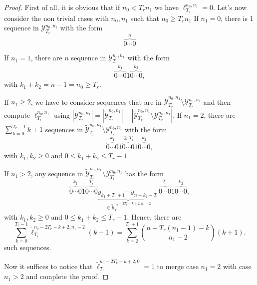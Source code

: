 \documentclass{article}
\begin{document}
  \begin{proof}
    First of all, it is obvious that if $n_0 < T_r n_1$ we have $\ell_{T_r}^{n_0,n_1} = 0$. Let's now consider the non trivial cases with $n_0, n_1$ such that $n_0 \geq T_r n_1$
    If $n_1 = 0$, there is 1 sequence in $\mathcal{Y}_{T_r}^{n_0, n_1}$ with the form 
    \begin{equation*}
      \overbrace{0 \cdots 0}^n
    \end{equation*} 

    If $n_1 = 1$, there are $n$ sequence in $\mathcal{Y}_{T_r}^{n_0, n_1}$ with the form 
    \begin{equation*}
      \overbrace{0 \cdots 0}^{k_1} 1 \overbrace{0 \cdots 0}^{k_2},
    \end{equation*}
    with $k_1 + k_2 = n - 1 = n_0 \geq T_r$.
      
    If $n_1 \geq 2$, we have to consider sequences that are in $\tilde{\mathcal{Y}}_{T_r}^{n_0, n_1} \setminus \mathcal{Y}_{T_r}^{n_0, n_1}$ and then
    compute $\ell_{T_r}^{n_0,n_1}$ using 
    $\left|\mathcal{Y}_{T_r}^{n_0, n_1}\right| = \left|\tilde{\mathcal{Y}}_{T_r}^{n_0, n_1}\right| - \left|\tilde{\mathcal{Y}}_{T_r}^{n_0, n_1} \setminus \mathcal{Y}_{T_r}^{n_0, n_1}\right|$.
    If $n_1 = 2$, there are $\sum_{k=0}^{T_r-1} k+1$ sequences in $\tilde{\mathcal{Y}}_{T_r}^{n_0, n_1}\setminus\mathcal{Y}_{T_r}^{n_0, n_1}$ 
    with the form 
    \begin{equation*}
      \overbrace{0\cdots0}^{k_1} 1 \overbrace{0\cdots0}^{\geq T_r} 1 \overbrace{0\cdots0}^{k_2},
    \end{equation*}
    with $k_1, k_2 \geq 0$ and $0 \leq k_1 + k_2 \leq T_r - 1$.

    If $n_1 > 2$, any sequence in $\tilde{\mathcal{Y}}_{T_r}^{n_0, n_1}\setminus\mathcal{Y}_{T_r}^{n_0, n_1}$ has the form 
    \begin{equation}
      \overbrace{0\cdots0}^{k_1} 1 \overbrace{0\cdots0}^{T_r} \underbrace{y_{k_1 + T_r + 1} \cdots y_{n-k_2 - T_r}}_{\in \tilde{\mathcal{Y}}^{n_0 - 2T_r - k + 2, n_1 -2}_{T_r}} \overbrace{0\cdots0}^{T_r} 1 \overbrace{0\cdots0}^{k_2},
    \end{equation}
    with $k_1, k_2 \geq 0$ and $0 \leq k_1 + k_2 \leq T_r - 1$. Hence, there are 
    \begin{equation}
      \sum_{k=0}^{T_r-1} \tilde{\ell}_{T_r}^{n_0 - 2T_r - k + 2,n_1-2} (k+1) = \sum_{k=2}^{T_r+1} \binom{n - T_r(n_1 - 1) - k}{n_1-2}(k+1).
    \end{equation}
    such sequences.

    Now it suffices to notice that $\tilde{\ell}_{T_r}^{n_0 - 2T_r - k + 2, 0} = 1$ to merge case $n_1 = 2$ with case $n_1 > 2$ and complete 
    the proof.
  \end{proof}
\end{document}

